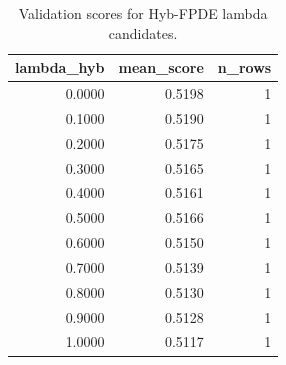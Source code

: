 \begin{table}[t]
\caption{Validation scores for Hyb-FPDE lambda candidates.}
\label{tab:lambda_distribution_computed}
\centering
\begin{tabular}{rrr}
\toprule
lambda\_hyb & mean\_score & n\_rows \\
\midrule
0.0000 & 0.5198 & 1 \\
0.1000 & 0.5190 & 1 \\
0.2000 & 0.5175 & 1 \\
0.3000 & 0.5165 & 1 \\
0.4000 & 0.5161 & 1 \\
0.5000 & 0.5166 & 1 \\
0.6000 & 0.5150 & 1 \\
0.7000 & 0.5139 & 1 \\
0.8000 & 0.5130 & 1 \\
0.9000 & 0.5128 & 1 \\
1.0000 & 0.5117 & 1 \\
\bottomrule
\end{tabular}

\end{table}
